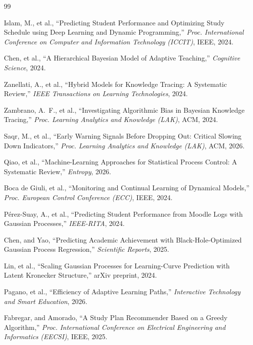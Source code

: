 \documentclass[12pt]{report}
\begin{document}
\begin{thebibliography}{99}

 Islam, M., et al., ``Predicting Student Performance and Optimizing Study Schedule using Deep Learning and Dynamic Programming,'' \textit{Proc. International Conference on Computer and Information Technology (ICCIT)}, IEEE, 2024.

 Chen, et al., ``A Hierarchical Bayesian Model of Adaptive Teaching,'' \textit{Cognitive Science}, 2024.

 Zanellati, A., et al., ``Hybrid Models for Knowledge Tracing: A Systematic Review,'' \textit{IEEE Transactions on Learning Technologies}, 2024.

 Zambrano, A.~F., et al., ``Investigating Algorithmic Bias in Bayesian Knowledge Tracing,'' \textit{Proc. Learning Analytics and Knowledge (LAK)}, ACM, 2024.

 Saqr, M., et al., ``Early Warning Signals Before Dropping Out: Critical Slowing Down Indicators,'' \textit{Proc. Learning Analytics and Knowledge (LAK)}, ACM, 2026.

 Qiao, et al., ``Machine-Learning Approaches for Statistical Process Control: A Systematic Review,'' \textit{Entropy}, 2026.

 Boca de Giuli, et al., ``Monitoring and Continual Learning of Dynamical Models,'' \textit{Proc. European Control Conference (ECC)}, IEEE, 2024.

 P\'erez-Suay, A., et al., ``Predicting Student Performance from Moodle Logs with Gaussian Processes,'' \textit{IEEE-RITA}, 2024.

 Chen, and Yao, ``Predicting Academic Achievement with Black-Hole-Optimized Gaussian Process Regression,'' \textit{Scientific Reports}, 2025.

 Lin, et al., ``Scaling Gaussian Processes for Learning-Curve Prediction with Latent Kronecker Structure,'' arXiv preprint, 2024.

 Pagano, et al., ``Efficiency of Adaptive Learning Paths,'' \textit{Interactive Technology and Smart Education}, 2026.

 Fabregar, and Amorado, ``A Study Plan Recommender Based on a Greedy Algorithm,'' \textit{Proc. International Conference on Electrical Engineering and Informatics (EECSI)}, IEEE, 2025.


\end{thebibliography}
\end{document}
